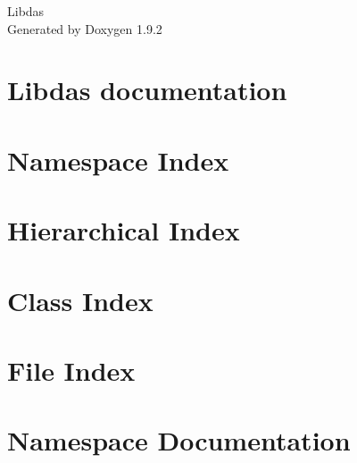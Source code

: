 \documentclass[twoside]{book}
\newcommand{\+}{\discretionary{\mbox{\scriptsize$\hookleftarrow$}}{}{}}
\newcommand{\clearemptydoublepage}{%
    \newpage{\pagestyle{empty}\cleardoublepage}%
  }
\begin{document}
  \raggedbottom
    \hypersetup{pageanchor=false,
                bookmarksnumbered=true,
                pdfencoding=unicode
               }
  \begin{titlepage}
  \vspace*{7cm}
  \begin{center}%
  {\Large Libdas}\\
  \vspace*{1cm}
  {\large Generated by Doxygen 1.9.2}\\
  \end{center}
  \end{titlepage}
  \clearemptydoublepage
  \tableofcontents
  \clearemptydoublepage
  \hypersetup{pageanchor=true}
\chapter{Libdas documentation}
\label{index}\hypertarget{index}{}
\chapter{Namespace Index}

\chapter{Hierarchical Index}

\chapter{Class Index}

\chapter{File Index}

\chapter{Namespace Documentation}


\end{document}
